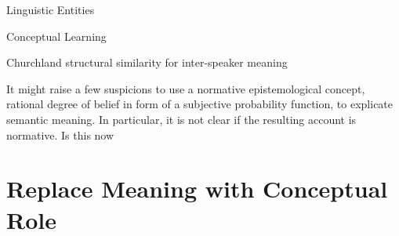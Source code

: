 \documentclass[11pt, a4paper]{scrartcl}
\begin{document}
Linguistic Entities

Conceptual Learning

Churchland structural similarity for inter-speaker meaning

It might raise a few suspicions to use a normative epistemological concept, rational degree of belief in form of a subjective probability function, to explicate semantic meaning. In particular, it is not clear if the resulting account is normative. Is this now
\section{Replace Meaning with Conceptual Role}
\begin{singlespacing}
\printbibliography{}
\end{singlespacing}
\end{document}
